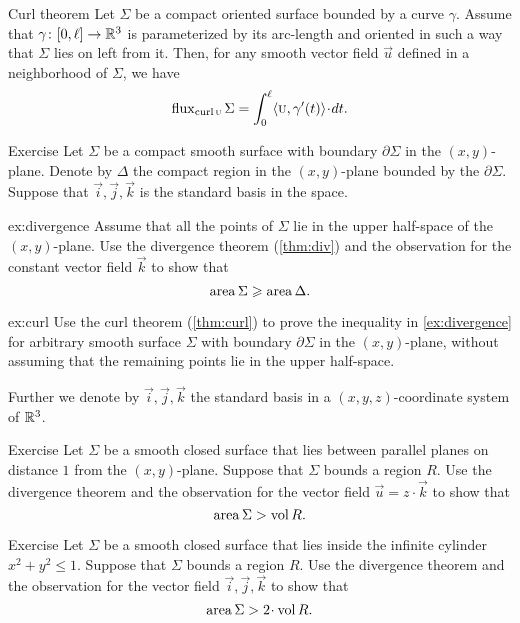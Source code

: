 \begin{thm}{Curl theorem}\label{thm:curl}
Let $\Sigma$ be a compact oriented surface bounded by a curve $\gamma$.
Assume that $\gamma\colon[0,\ell]\to \mathbb{R}^3$ is parameterized by its arc-length and oriented in such a way that $\Sigma$ lies on left from it.
Then, for any smooth vector field $\vec u$ defined in a neighborhood of $\Sigma$, we have
\[\flux_{\curl\vec u}\Sigma=\int_0^\ell\langle\vec u,\gamma'(t)\rangle\cdot dt.\]

\end{thm}


\begin{thm}{Exercise}\label{ex:divergence-1}
Let $\Sigma$ be a compact smooth surface with boundary $\partial \Sigma$ in the $(x,y)$-plane.
Denote by $\Delta$ the compact region in the $(x,y)$-plane bounded by the $\partial \Sigma$.
Suppose that $\vec i,\vec j,\vec k$ is the standard basis in the space.

\begin{subthm}{ex:divergence}
Assume that all the points of $\Sigma$ lie in the upper half-space of the $(x,y)$-plane.
Use the divergence theorem (\ref{thm:div}) and the observation for the constant vector field $\vec k$
to show that 
\[\mathop{\rm area}\nolimits\Sigma\geqslant\mathop{\rm area}\nolimits\Delta.\]
\end{subthm}

\begin{subthm}{ex:curl} 
Use the curl theorem (\ref{thm:curl}) to prove the inequality in \ref{ex:divergence} for arbitrary smooth surface $\Sigma$ with boundary $\partial \Sigma$ in the $(x,y)$-plane, without assuming that the remaining points lie in the upper half-space.
\end{subthm}

\end{thm}

Further we denote by $\vec i,\vec j,\vec k$ the standard basis in a $(x,y,z)$-coordinate system of $\mathbb{R}^3$.

\begin{thm}{Exercise}\label{ex:divergence-2}
Let $\Sigma$ be a smooth closed surface that lies between parallel planes on distance $1$ from the $(x,y)$-plane.
Suppose that $\Sigma$ bounds a region $R$.
Use the divergence theorem and the observation for the vector field $\vec u=z\cdot \vec k$ to  show that 
\[\mathop{\rm area}\nolimits \Sigma>\mathop{\rm vol}\nolimits R.\]
\end{thm}

\begin{thm}{Exercise}
Let $\Sigma$ be a smooth closed surface that lies inside the infinite cylinder $x^2+y^2\le 1$.
Suppose that $\Sigma$ bounds a region $R$.
Use the divergence theorem and the observation for the vector field $\vec i,\vec j,\vec k$ to show that  
\[\area \Sigma>2\cdot\vol R.\]
\end{thm}

